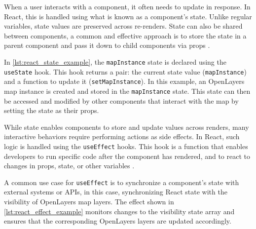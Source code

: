 \begin{figure}[h]

\end{figure}

When a user interacts with a component, it often needs to update in response. In React, this is handled using what is known as a component's state. Unlike regular variables, state values are preserved across re-renders. State can also be shared between components, a common and effective approach is to store the state in a parent component and pass it down to child components via props \cite{react_state}.

In \autoref{lst:react_state_example}, the \texttt{mapInstance} state is declared using the \texttt{useState} hook. This hook returns a pair: the current state value (\texttt{mapInstance}) and a function to update it (\texttt{setMapInstance}). In this example, an OpenLayers map instance is created and stored in the \texttt{mapInstance} state. This state can then be accessed and modified by other components that interact with the map by setting the state as their props.

\begin{figure}[h]

\end{figure}

While state enables components to store and update values across renders, many interactive behaviors require performing actions as side effects. In React, such logic is handled using the \texttt{useEffect} hooks. This hook is a function that enables developers to run specific code after the component has rendered, and to react to changes in props, state, or other variables \cite{react_useEffect}.

A common use case for \texttt{useEffect} is to synchronize a component's state with external systems or APIs, in this case, synchronizing React state with the visibility of OpenLayers map layers. The effect shown in \autoref{lst:react_effect_example} monitors changes to the visibility state array and ensures that the corresponding OpenLayers layers are updated accordingly.

\begin{figure}[h]

\end{figure}

